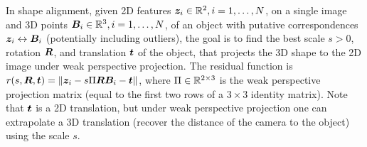 In shape alignment, given 2D features ${\bm z}_i \in { {\mathbb R}^{2} }, i=1,\ldots,N$, on a single image and 3D points ${\bm B}_i \in { {\mathbb R}^{3} }, i=1,\ldots,N$,
of an object with putative correspondences ${\bm z}_i \leftrightarrow {\bm B}_i$ (potentially including outliers), the goal is to find the best scale $s >0$, rotation ${\bm R}$, and translation ${\bm t}$ of the object, %
 that projects the 3D shape to the 2D image under weak perspective projection. The residual function is $r(s,{\bm R},{\bm t}) = \| {\bm z}_i - s\Pi{\bm R} {\bm B}_i - {\bm t} \|$, where $\Pi \in { {\mathbb R}^{2 \times 3} }$ is the weak perspective projection matrix (equal to the first two rows of a $3\!\times\!3$ identity matrix). %
 Note that ${\bm t}$ is a 2D translation, but under weak perspective projection one can extrapolate a 3D translation 
 (\ie recover the distance of the camera to the object) using the scale $s$. 

